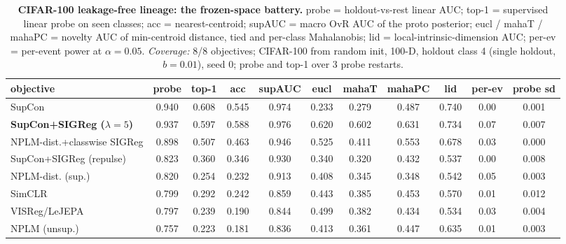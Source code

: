 \begin{landscape}
\begin{table}[p]
\centering
\footnotesize
\setlength{\tabcolsep}{3pt}
\begin{tabular}{lcccccccccc}
\toprule
objective & probe & top-1 & acc & supAUC & eucl & mahaT & mahaPC & lid & per-ev & probe sd \\
\midrule
SupCon & 0.940 & 0.608 & 0.545 & 0.974 & 0.233 & 0.279 & 0.487 & 0.740 & 0.00 & 0.001 \\
\textbf{SupCon+SIGReg ($\lambda{=}5$)} & 0.937 & 0.597 & 0.588 & 0.976 & 0.620 & 0.602 & 0.631 & 0.734 & 0.07 & 0.007 \\
NPLM-dist.+classwise SIGReg & 0.898 & 0.507 & 0.463 & 0.946 & 0.525 & 0.411 & 0.553 & 0.678 & 0.03 & 0.000 \\
SupCon+SIGReg (repulse) & 0.823 & 0.360 & 0.346 & 0.930 & 0.340 & 0.320 & 0.432 & 0.537 & 0.00 & 0.008 \\
NPLM-dist. (sup.) & 0.820 & 0.254 & 0.232 & 0.913 & 0.408 & 0.345 & 0.348 & 0.542 & 0.05 & 0.003 \\
SimCLR & 0.799 & 0.292 & 0.242 & 0.859 & 0.443 & 0.385 & 0.453 & 0.570 & 0.01 & 0.012 \\
VISReg/LeJEPA & 0.797 & 0.239 & 0.190 & 0.844 & 0.499 & 0.382 & 0.434 & 0.534 & 0.03 & 0.004 \\
NPLM (unsup.) & 0.757 & 0.223 & 0.181 & 0.836 & 0.413 & 0.361 & 0.447 & 0.635 & 0.01 & 0.003 \\
\bottomrule
\end{tabular}
\caption{\textbf{CIFAR-100 leakage-free lineage: the frozen-space battery.} probe = holdout-vs-rest linear AUC; top-1 = supervised linear probe on seen classes; acc = nearest-centroid; supAUC = macro OvR AUC of the proto posterior; eucl / mahaT / mahaPC = novelty AUC of min-centroid distance, tied and per-class Mahalanobis; lid = local-intrinsic-dimension AUC; per-ev = per-event power at $\alpha{=}0.05$. \emph{Coverage:} 8/8 objectives; CIFAR-100 from random init, 100-D, holdout class 4 (single holdout, $b=0.01$), seed 0; probe and top-1 over 3 probe restarts.}
\label{tab:app_cifar100_pre}
\end{table}
\end{landscape}

